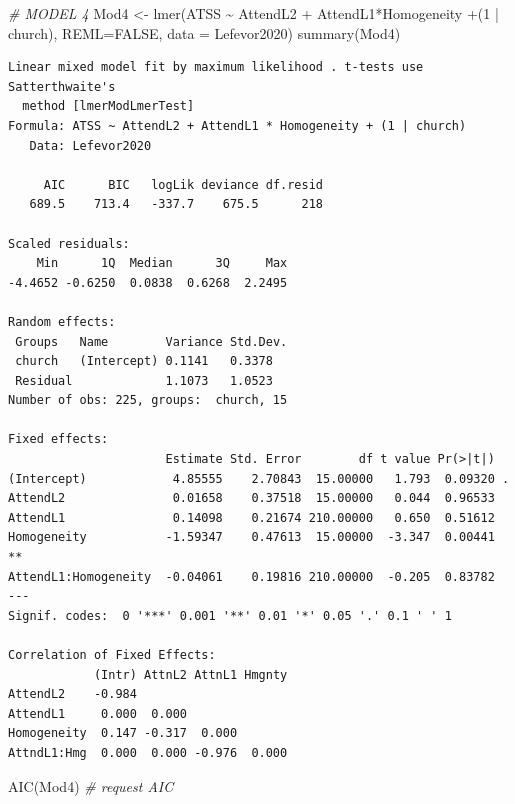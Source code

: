 \documentclass[
  11pt,
]{book}
\newenvironment{Shaded}{\begin{snugshade}}{\end{snugshade}}
\newcommand{\AttributeTok}[1]{\textcolor[rgb]{0.77,0.63,0.00}{#1}}
\newcommand{\CommentTok}[1]{\textcolor[rgb]{0.56,0.35,0.01}{\textit{#1}}}
\newcommand{\ConstantTok}[1]{\textcolor[rgb]{0.00,0.00,0.00}{#1}}
\newcommand{\DecValTok}[1]{\textcolor[rgb]{0.00,0.00,0.81}{#1}}
\newcommand{\FunctionTok}[1]{\textcolor[rgb]{0.00,0.00,0.00}{#1}}
\newcommand{\NormalTok}[1]{#1}
\newcommand{\OtherTok}[1]{\textcolor[rgb]{0.56,0.35,0.01}{#1}}
\newcommand{\SpecialCharTok}[1]{\textcolor[rgb]{0.00,0.00,0.00}{#1}}
\begin{document}
\begin{Shaded}
\begin{Highlighting}[]
\CommentTok{\# MODEL 4}
\NormalTok{Mod4 }\OtherTok{\textless{}{-}} \FunctionTok{lmer}\NormalTok{(ATSS }\SpecialCharTok{\textasciitilde{}}\NormalTok{ AttendL2 }\SpecialCharTok{+}\NormalTok{ AttendL1}\SpecialCharTok{*}\NormalTok{Homogeneity }\SpecialCharTok{+}\NormalTok{(}\DecValTok{1} \SpecialCharTok{|}\NormalTok{ church), }\AttributeTok{REML=}\ConstantTok{FALSE}\NormalTok{, }\AttributeTok{data =}\NormalTok{ Lefevor2020)}
\FunctionTok{summary}\NormalTok{(Mod4)}
\end{Highlighting}
\end{Shaded}

\begin{verbatim}
Linear mixed model fit by maximum likelihood . t-tests use Satterthwaite's
  method [lmerModLmerTest]
Formula: ATSS ~ AttendL2 + AttendL1 * Homogeneity + (1 | church)
   Data: Lefevor2020

     AIC      BIC   logLik deviance df.resid 
   689.5    713.4   -337.7    675.5      218 

Scaled residuals: 
    Min      1Q  Median      3Q     Max 
-4.4652 -0.6250  0.0838  0.6268  2.2495 

Random effects:
 Groups   Name        Variance Std.Dev.
 church   (Intercept) 0.1141   0.3378  
 Residual             1.1073   1.0523  
Number of obs: 225, groups:  church, 15

Fixed effects:
                      Estimate Std. Error        df t value Pr(>|t|)   
(Intercept)            4.85555    2.70843  15.00000   1.793  0.09320 . 
AttendL2               0.01658    0.37518  15.00000   0.044  0.96533   
AttendL1               0.14098    0.21674 210.00000   0.650  0.51612   
Homogeneity           -1.59347    0.47613  15.00000  -3.347  0.00441 **
AttendL1:Homogeneity  -0.04061    0.19816 210.00000  -0.205  0.83782   
---
Signif. codes:  0 '***' 0.001 '**' 0.01 '*' 0.05 '.' 0.1 ' ' 1

Correlation of Fixed Effects:
            (Intr) AttnL2 AttnL1 Hmgnty
AttendL2    -0.984                     
AttendL1     0.000  0.000              
Homogeneity  0.147 -0.317  0.000       
AttndL1:Hmg  0.000  0.000 -0.976  0.000
\end{verbatim}

\begin{Shaded}
\begin{Highlighting}[]
\FunctionTok{AIC}\NormalTok{(Mod4) }\CommentTok{\# request AIC}
\end{Highlighting}
\end{Shaded}
\end{document}
